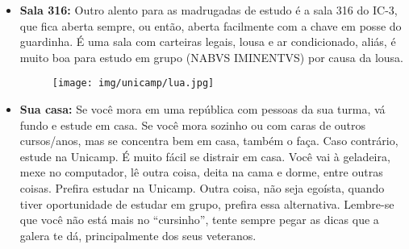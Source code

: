 \begin{itemize}
    \item  \textbf{Sala 316:} Outro alento para as madrugadas de estudo é a sala
        316 do IC-3, que fica aberta sempre, ou então, aberta facilmente com a
        chave em posse do guardinha. É uma sala com carteiras legais, lousa e ar
        condicionado, aliás, é muito boa para estudo em grupo (NABVS IMINENTVS)
        por causa da lousa.

        \begin{figure}[h!]
            \centering
            \texttt{[image: img/unicamp/lua.jpg]}
        \end{figure}

     \item  \textbf{Sua casa:} Se você mora em uma república com pessoas da sua
        turma, vá fundo e estude em casa. Se você mora sozinho ou com caras de
        outros cursos/anos, mas se concentra bem em casa, também o faça. Caso
        contrário, estude na Unicamp. É muito fácil se distrair em casa. Você
        vai à geladeira, mexe no computador, lê outra coisa, deita na cama e
        dorme, entre outras coisas. Prefira estudar na Unicamp. Outra coisa, não
        seja egoísta, quando tiver oportunidade de estudar em grupo, prefira
        essa alternativa. Lembre-se que você não está mais no ``cursinho'',
        tente sempre pegar as dicas que a galera te dá, principalmente dos seus
        veteranos.
\end{itemize}
